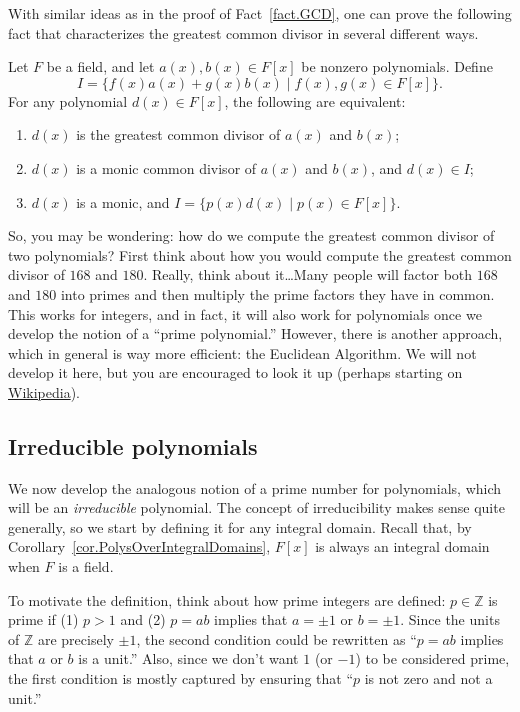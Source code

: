 With similar ideas as in the proof of Fact~\ref{fact.GCD}, one can prove the following fact that characterizes the greatest common divisor in several different ways.

\begin{fact}
Let $F$ be a field, and let $a(x), b(x)\in F[x]$ be nonzero polynomials. Define \[I = \{f(x)a(x) + g(x)b(x)\mid f(x),g(x)\in F[x]\}.\]
For any polynomial $d(x)\in F[x]$, the following are equivalent:
\begin{enumerate}
\item $d(x)$ is the greatest common divisor of $a(x)$ and $b(x)$;
\item $d(x)$ is a monic common divisor of $a(x)$ and $b(x)$, and $d(x) \in I$;
\item $d(x)$ is a monic, and $I = \{p(x)d(x)\mid p(x)\in F[x]\}$.
\end{enumerate}
\end{fact}

So, you may be wondering: how do we compute the greatest common divisor of two polynomials? First think about how you would compute the greatest common divisor of $168$ and $180$. Really, think about it\ldots Many people will factor both  $168$ and $180$ into primes and then multiply the prime factors they have in common. This works for integers, and in fact, it will also work for polynomials once we develop the notion of a ``prime polynomial.'' However, there is another approach, which in general is way more efficient: the Euclidean Algorithm. We will not develop it here, but you are encouraged to look it up (perhaps starting on \href{https://en.wikipedia.org/wiki/Polynomial_greatest_common_divisor}{Wikipedia}).

\subsection{Irreducible polynomials}
We now develop the analogous notion of a prime number for polynomials, which will be an \emph{irreducible} polynomial.  The concept of irreducibility makes sense quite generally, so we start by defining it for any integral domain. Recall that, by Corollary~\ref{cor.PolysOverIntegralDomains}, $F[x]$ is always an integral domain when $F$ is a field. 

To motivate the definition, think about how prime integers are defined: $p\in \mathbb{Z}$ is prime if (1) $p>1$ and (2) $p=ab$ implies that $a=\pm 1$ or $b=\pm1$. Since the  units of $\mathbb{Z}$ are precisely $\pm1$, the second condition could be rewritten as ``$p=ab$ implies that $a$ or $b$ is a unit.'' Also, since we don't  want $1$ (or $-1$) to be considered prime, the first condition is mostly captured by ensuring that ``$p$ is not zero and not a unit.'' 

